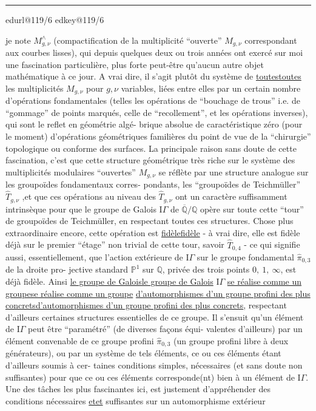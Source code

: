 \documentclass[11pt,a4paper]{article}
\makeatletter
\newif\ifdiplomatic
\newif\ifreading
\def\CurrentScanURL{}
\def\CurrentPageKey{}
\def\CurrentApparatus{}
\newcounter{appnote}
\newcommand{\scanpage}[1]{%
  \clearpage
  \expandafter\let\expandafter\CurrentScanURL\csname edurl@#1\endcsname
  \expandafter\let\expandafter\CurrentPageKey\csname edkey@#1\endcsname
  \def\CurrentApparatus{}%
  \hypertarget{scan-\CurrentPageKey}{}%
  \typeout{EDITION-SCAN: \CurrentPageKey; PDFPAGE: \the\numexpr\ReadonlyShipoutCounter+1\relax}%
  \ifreading
    \marginnote{\raggedright\scriptsize\sffamily\href{\CurrentScanURL}{119 / \csname edpage@#1\endcsname}}%
  \else
    \noindent{\small\sffamily\href{\CurrentScanURL}{[scan #1]}}\par\smallskip
  \fi}
\newcommand{\mspage}[1]{%
  \ifreading\marginnote{\raggedright\scriptsize\sffamily p.\,#1}[2\baselineskip]%
  \else\noindent{\small\sffamily[p.\,#1]}\par\smallskip\fi}
\let\TextUline\uline
\renewcommand{\uline}[1]{\ifmmode\underline{#1}\else\TextUline{#1}\fi}
\newcommand{\AppItem}[2]{%
  \ifcsdef{edvariant@#2}{%
    \ifcsempty{edvariant@#2}{\PackageError{Esquisse}{Empty apparatus entry #2}{Every executed apparatus marker requires its printed note.}}{}%
  }{\PackageError{Esquisse}{Undefined apparatus entry #2}{Every executed apparatus marker requires its printed note.}}%
  \typeout{EDITION-APP-ENTRY: #2; NUMBER: #1}%
  \par\noindent\textsuperscript{#1}\csname edvariant@#2\endcsname}
\newcommand{\EditionApp}[1]{%
  \stepcounter{appnote}%
  \ifmmode{}^{\scriptscriptstyle\theappnote}\else\textsuperscript{\theappnote}\fi
  \begingroup\edef\x{\endgroup\noexpand\gappto\noexpand\CurrentApparatus{\noexpand\AppItem{\theappnote}{#1}}}\x}
\newcommand{\var}[4]{\ifdiplomatic#1\else#2\ifreading\else\EditionApp{#4}\fi\fi}
\newcommand{\finishscan}{\ifx\CurrentApparatus\empty\else\par\bigskip\noindent\rule{.35\linewidth}{.35pt}\par\smallskip{\footnotesize\setlength{\parskip}{3pt}\CurrentApparatus}\fi}
\makeatother
\begin{document}
\finishscan
\scanpage{119/6}
\mspage{4}

je note $M^{\wedge}_{g,\nu}$ (compactification de la multiplicité ``ouverte''
$M_{g,\nu}$ correspondant aux courbes lisses), qui depuis quelques deux
ou trois années ont exercé sur moi une fascination particulière,
plus forte peut-être qu'aucun autre objet mathématique à ce jour.
A vrai dire, il s'agit plutôt du système de \uline{toutes} les multiplicités
$M_{g,\nu}$ pour $g,\nu$ variables, liées entre elles par un certain nombre
d'opérations fondamentales (telles les opérations de ``bouchage de
trous'' i.e. de ``gommage'' de points marqués, celle de ``recollement'',
et les opérations inverses), qui sont le reflet en géométrie algé-%
brique absolue de caractéristique zéro (pour le moment) d'opérations
géométriques familières du point de vue de la ``chirurgie'' topologique
ou conforme \var{des surface.}{des surfaces.}{slip corrected}{V-FR-006-001} La principale raison sans doute de cette
fascination, c'est que cette structure géométrique très riche sur le
système des multiplicités modulaires ``ouvertes'' $M_{g,\nu}$ se réflète
par une structure analogue sur les groupoïdes fondamentaux corres-%
pondants, les ``groupoïdes de Teichmüller'' $\hat{T}_{g,\nu}$ ,et que ces opérations
au niveau des $\hat{T}_{g,\nu}$ ont un caractère suffisamment intrinsèque pour
que le groupe de Galois $\mathrm{I}\!\Gamma$ de $\overline{\mathbb{Q}}/\mathbb{Q}$ opère sur toute cette ``tour'' de
groupoïdes de Teichmüller, en respectant toutes ces structures. Chose
plus extraordinaire encore, cette opération est \uline{fidèle} - à vrai dire,
elle est fidèle déjà sur le premier ``étage'' non trivial de cette tour,
savoir $\hat{T}_{0,4}$ - ce qui signifie aussi, essentiellement, que l'action
extérieure de $\mathrm{I}\!\Gamma$ sur le groupe fondamental $\hat{\pi}_{0,3}$ de la droite pro-%
jective standard $\mathbb{P}^1$ sur $\mathbb{Q}$, privée des trois points $0,\ 1,\ \infty$, est
déjà fidèle. Ainsi \uline{le groupe de Galois} $\mathrm{I}\!\Gamma$ \uline{se réalise comme un groupe}
\uline{\var{d'automorphisme d'un groupe profini}{d'automorphismes d'un groupe profini}{slip corrected}{V-FR-006-002} des plus concrets}, respectant
d'ailleurs certaines structures essentielles de ce groupe. Il s'ensuit
qu'un élément de $\mathrm{I}\!\Gamma$ peut être ``paramétré'' (de diverses façons équi-%
valentes d'ailleurs) par un élément convenable de ce groupe profini
$\hat{\pi}_{0,3}$ (un groupe profini libre à deux générateurs), ou par un système
de tels éléments, ce ou ces éléments étant d'ailleurs soumis à cer-%
taines conditions simples, nécessaires (et sans doute non suffisantes)
pour que ce ou ces éléments corresponde(nt) bien à un élément de $\mathrm{I}\!\Gamma$.
Une des tâches les plus fascinantes ici, est justement d'appréhender
des conditions nécessaires \uline{et} suffisantes sur un automorphisme extérieur
\end{document}
